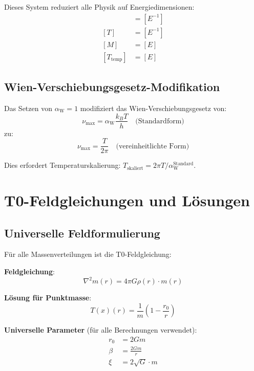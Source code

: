 \documentclass[12pt,a4paper]{article}
\newcommand{\Tfield}{T(x)}
\newcommand{\alphaW}{\alpha_{\text{W}}}
\begin{document}
	Dieses System reduziert alle Physik auf Energiedimensionen:
	\begin{align}
		[L] &= [E^{-1}] \\
		[T] &= [E^{-1}] \\
		[M] &= [E] \\
		[T_{\text{temp}}] &= [E]
	\end{align}
	
	\subsection{Wien-Verschiebungsgesetz-Modifikation}
	\label{subsec:wien_modifikation}
	
	Das Setzen von $\alphaW = 1$ modifiziert das Wien-Verschiebungsgesetz von:
	\begin{equation}
		\nu_{\max} = \alphaW \frac{k_B T}{h} \quad \text{(Standardform)}
	\end{equation}
	zu:
	\begin{equation}
		\nu_{\max} = \frac{T}{2\pi} \quad \text{(vereinheitlichte Form)}
	\end{equation}
	
	Dies erfordert Temperaturskalierung: $T_{\text{skaliert}} = 2\pi T / \alphaW^{\text{Standard}}$.
	
	\section{T0-Feldgleichungen und Lösungen}
	\label{sec:feldgleichungen}
	
	\subsection{Universelle Feldformulierung}
	\label{subsec:universelle_formulierung}
	
	Für alle Massenverteilungen ist die T0-Feldgleichung:
	
	\textbf{Feldgleichung}:
	\begin{equation}
		\nabla^2 m(r) = 4\pi G \rho(r) \cdot m(r)
	\end{equation}
	
	\textbf{Lösung für Punktmasse}:
	\begin{equation}
		\Tfield(r) = \frac{1}{m}\left(1 - \frac{r_0}{r}\right)
	\end{equation}
	
	\textbf{Universelle Parameter} (für alle Berechnungen verwendet):
	\begin{align}
		r_0 &= 2Gm \\
		\beta &= \frac{2Gm}{r} \\
		\xi &= 2\sqrt{G} \cdot m
	\end{align}
	
\end{document}
